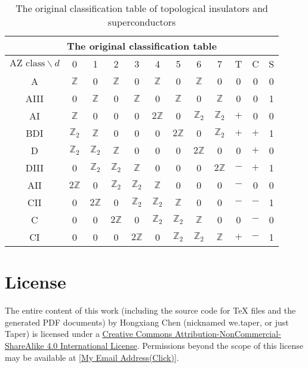 \documentclass{article}
\begin{document}
\begin{table}
\begin{center}
\begin{tabular}{|c|cccccccc|ccc|}
\hline
\multicolumn{12}{|c|}{
The original classification table} \\ \hline
   $\mbox{AZ class} \backslash d$  & 0 & 1 & 2 & 3 & 4 & 5 & 6 & 7 & T & C & S  \\
\hline\hline
  A & $\mathbb{Z}$ & 0 & $\mathbb{Z}$ & 0 & $\mathbb{Z}$ & 0 & $\mathbb{Z}$ & 0             & 0 & 0 & 0    \\
  AIII & 0 & $\mathbb{Z}$ & 0 & $\mathbb{Z}$ & 0 & $\mathbb{Z}$ & 0 & $\mathbb{Z}$          & 0 & 0 & 1    \\  \hline

  AI & $\mathbb{Z}$ & 0 & 0 & 0 & $2\mathbb{Z}$ & 0 & $\mathbb{Z}_2$ & $\mathbb{Z}_2$    & $+$ & 0 & 0     \\
  BDI & $\mathbb{Z}_2$ & $\mathbb{Z}$ & 0 & 0 & 0 & $2\mathbb{Z}$ & 0 & $\mathbb{Z}_2$     & $+$ & $+$ & 1    \\
  D & $\mathbb{Z}_2$ & $\mathbb{Z}_2$ & $\mathbb{Z}$ & 0 & 0 & 0 & $2\mathbb{Z}$ & 0     & 0 & $+$ & 0     \\
  DIII & 0 & $\mathbb{Z}_2$ & $\mathbb{Z}_2$ & $\mathbb{Z}$ & 0 & 0 & 0 & $2\mathbb{Z}$  & $-$ & $+$ & 1     \\
  AII & $2\mathbb{Z}$ & 0 & $\mathbb{Z}_2$ & $\mathbb{Z}_2$ & $\mathbb{Z}$ & 0 & 0 & 0   & $-$ & 0 & 0     \\
  CII & 0 & $2\mathbb{Z}$ & 0 & $\mathbb{Z}_2$ & $\mathbb{Z}_2$ & $\mathbb{Z}$ & 0 & 0   & $-$ & $-$ & 1     \\
  C & 0 & 0 & $2\mathbb{Z}$ & 0 & $\mathbb{Z}_2$ & $\mathbb{Z}_2$ & $\mathbb{Z}$ & 0     & 0 & $-$ & 0     \\
  CI & 0 & 0 & 0 & $2\mathbb{Z}$ & 0 & $\mathbb{Z}_2$ & $\mathbb{Z}_2$ & $\mathbb{Z}$    & $+$ & $-$ & 1
   \\
\hline
\end{tabular}
\caption{The original classification table of topological insulators and
superconductors}
\label{tab:master-table2}
\end{center}
\end{table}
\section{License}
The entire content of this work (including the source code
for TeX files and the generated PDF documents) by 
Hongxiang Chen (nicknamed we.taper, or just Taper) is
licensed under a 
\href{http://creativecommons.org/licenses/by-nc-sa/4.0/}{Creative 
Commons Attribution-NonCommercial-ShareAlike 4.0 International 
License}. Permissions beyond the scope of this 
license may be available at 
\href{http://www.google.com/recaptcha/mailhide/d?k=015LguzBJigi0rpyuJRqLoig==\&c=p1c-M-mm7ZcjUCkTuZZa9eEPHRVk6paN0694iazlQy8=}
{[My Email Address(Click)]}.

{}

\printnomenclature
\end{document}
